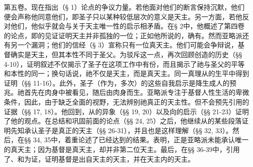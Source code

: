 第五卷。现在指出（§ 1）论点的争议力量。若他面对他们的断言保持沉默，他们便会声称他同意他们，即圣子只以某种较低层次的意义是天主。另一方面，若他反对他们，他似乎就会与关于天主唯一性的启示相矛盾。在§ 2中，他概述了第四卷的论点，即的见证证明天主并非孤独的一位；正如他所说的，确有。然而亚略派还有另一个漏洞；他们的信经（§ 3）宣称只有一位真天主。他们可能会争辩说，基督确实是天主，但其本性不同于圣父。为驳斥这一点，再次回顾创造的历史（§§ 4-10），证明叙述不仅揭示了圣子在这项工作中有份，而且揭示了祂与圣父的平等和本性的同一；换句话说，祂不仅是天主，而是真天主。同一真理从的生平中得到证明（§§ 11-16）。此外，圣子（作为，多次）的这些自我启示是降生成人的预兆。祂首先在肉身中被看见，随后由肉身而生。亚略派专注于基督人性生活的卑微条件，因此，由于缺乏全面的视野，无法辨别祂真正的天主性。但不会预先引用的证据（§§ 17, 18）。他回到，从的异象（§§ 19, 20）以及向的启示（§§ 21-23）证明了他的观点。在总结和巩固前面的论点（§§ 24, 25）之后，他继续从的某些段落证明先知承认圣子是真正的天主（§§ 26-31），并且也是这样理解（§§ 32, 33）。然后，在§§ 34, 35中，着重论述了已经达到的结果。表明，正是亚略派未能承认唯一的真天主；因为基督是真天主，却并非第二位天主。最后，在§§ 36-39中，引用了、和为证，证明基督是出自天主的天主，并在天主内的天主。\par

